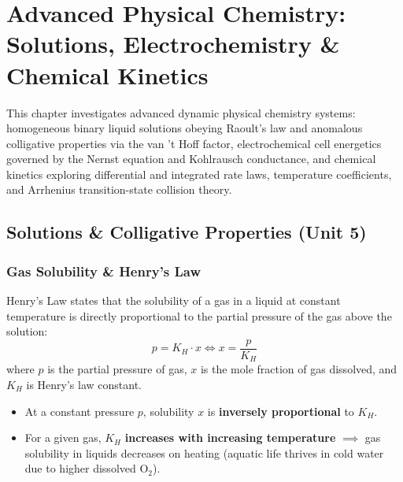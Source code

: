 \documentclass[10pt,twoside,openright]{book}
\begin{document}
\chapter{Advanced Physical Chemistry: Solutions, Electrochemistry \& Chemical Kinetics}

This chapter investigates advanced dynamic physical chemistry systems: homogeneous binary liquid solutions obeying Raoult's law and anomalous colligative properties via the van 't Hoff factor, electrochemical cell energetics governed by the Nernst equation and Kohlrausch conductance, and chemical kinetics exploring differential and integrated rate laws, temperature coefficients, and Arrhenius transition-state collision theory.

\section{Solutions \& Colligative Properties (Unit 5)}

\subsection{Gas Solubility \& Henry's Law}
Henry's Law states that the solubility of a gas in a liquid at constant temperature is directly proportional to the partial pressure of the gas above the solution:
\begin{equation}
  p = K_H \cdot x \iff x = \frac{p}{K_H}
\end{equation}
where $p$ is the partial pressure of gas, $x$ is the mole fraction of gas dissolved, and $K_H$ is Henry's law constant.
\begin{itemize}
  \item At a constant pressure $p$, solubility $x$ is \textbf{inversely proportional} to $K_H$.
  \item For a given gas, $K_H$ \textbf{increases with increasing temperature} $\implies$ gas solubility in liquids decreases on heating (aquatic life thrives in cold water due to higher dissolved $\mathrm{O_2}$).
\end{itemize}
\end{document}
